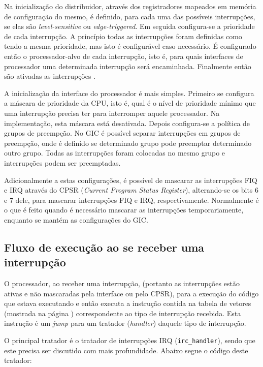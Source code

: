 Na inicialização do distribuidor, através dos registradores mapeados em memória de configuração do mesmo, é definido, para cada uma das possíveis interrupções, se elas são \emph{level-sensitive} ou \emph{edge-triggered}.
Em seguida configura-se a prioridade de cada interrupção. A princípio todas as interrupções foram definidas como tendo a mesma prioridade, mas isto é configurável caso necessário.
É configurado então o processador-alvo de cada interrupção, isto é, para quais interfaces de processador uma determinada interrupção será encaminhada. Finalmente então são ativadas as interrupções \cite{gic}.

A inicialização da interface do processador é mais simples. Primeiro se configura a máscara de prioridade da CPU, isto é, qual é o nível de prioridade mínimo que uma interrupção precisa ter para interromper aquele processador. Na implementação, esta máscara está desativada. Depois configura-se a política de grupos de preempção. No GIC é possível separar interrupções em grupos de preempção, onde é definido se determinado grupo pode preemptar determinado outro grupo. Todas as interrupções foram colocadas no mesmo grupo e interrupções podem ser preemptadas.

Adicionalmente a estas configurações, é possível de mascarar as interrupções FIQ e IRQ através do CPSR (\emph{Current Program Status Register}), alterando-se os bits 6 e 7 dele, para mascarar interrupções FIQ e IRQ, respectivamente. Normalmente é o que é feito quando é necessário mascarar as interrupções temporariamente, enquanto se mantém as configurações do GIC.

\subsection{Fluxo de execução ao se receber uma interrupção}

O processador, ao receber uma interrupção, (portanto as interrupções estão ativas e não mascaradas pela interface ou pelo CPSR), para a execução do código que estava executando e então executa a instrução contida na tabela de vetores (mostrada na página \pageref{dump}) correspondente ao tipo de interrupção recebida. Esta instrução é um \emph{jump} para um tratador (\emph{handler}) daquele tipo de interrupção.

O principal tratador é o tratador de interrupções IRQ (\verb+irc_handler+), sendo que este precisa ser discutido com mais profundidade. Abaixo segue o código deste tratador:

